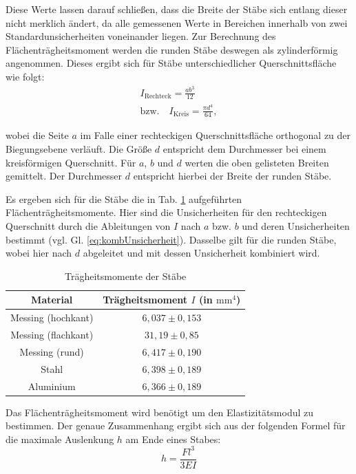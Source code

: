 	Diese Werte lassen darauf schließen, dass die Breite der Stäbe sich entlang dieser nicht merklich ändert, da alle gemessenen Werte in Bereichen innerhalb von zwei Standardunsicherheiten voneinander liegen.
	Zur Berechnung des Flächenträgheitsmoment werden die runden Stäbe deswegen als zylinderförmig angenommen.
	Dieses ergibt sich für Stäbe unterschiedlicher Querschnittsfläche wie folgt:
	\begin{align*}
	I_\text{Rechteck} = \frac{ab^3}{12} \\
	\text{bzw.} \quad I_\text{Kreis} =\frac{\pi d^4}{64}, 
	\end{align*}
	
	wobei die Seite $a$ im Falle einer rechteckigen Querschnittsfläche orthogonal zu der Biegungsebene verläuft. Die Größe $d$ entspricht dem Durchmesser bei einem kreisförmigen Querschnitt. Für $a$, $b$ und $d$ werten die oben gelisteten Breiten gemittelt. Der Durchmesser $d$ entspricht hierbei der Breite der runden Stäbe.
	
	Es ergeben sich für die Stäbe die in Tab. \ref{tab:Trägheitsmomente} aufgeführten Flächenträgheitsmomente. Hier sind die Unsicherheiten für den rechteckigen Querschnitt durch die Ableitungen von $I$ nach $a$ bzw. $b$ und deren Unsicherheiten bestimmt (vgl. Gl. \ref{eq:kombUnsicherheit}). Dasselbe gilt für die runden Stäbe, wobei hier nach $d$ abgeleitet und mit dessen Unsicherheit kombiniert wird.
	\begin{table}[ht]
		\caption{Trägheitsmomente der Stäbe}
		\centering
		\label{tab:Trägheitsmomente}
		\begin{tabular}{c|c}
			{Material} & {Trägheitsmoment $I$ (in $\text{mm}^4$)}\\ %
			\hline
			{Messing (hochkant)} & {$6,037\pm 0,153$}\\
			{Messing (flachkant)} & {$31,19\pm 0,85$}\\
			{Messing (rund)} & {$6,417\pm 0,190$}\\
			{Stahl} & {$6,398\pm 0,189$} \\
			{Aluminium} & {$6,366\pm 0,189$}\\	
		\end{tabular}
	\end{table}
	Das Flächenträgheitsmoment wird benötigt um den Elastizitätsmodul zu bestimmen. Der genaue Zusammenhang ergibt sich aus der folgenden Formel für die maximale Auslenkung $h$ am Ende eines Stabes:
	\begin{equation}
	h = \frac{Fl^3}{3EI} 
	\end{equation}
	
